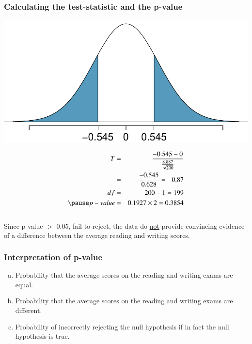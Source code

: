 \begin{frame}[shrink]
\frametitle{Calculating the test-statistic and the p-value}


{
\begin{center}
\includegraphics[width=\textwidth]{7-2_paired/figures/hsb2/hsb2_read_write_pval}
\end{center}
}
{
\pause
\begin{eqnarray*}
T &=& \frac{-0.545 - 0}{\frac{8.887}{\sqrt{200}}} \\
&=& \frac{-0.545}{0.628} = -0.87 \\
df &=& 200 - 1 = 199 \\
\pause
p-value &=& 0.1927 \times 2 = 0.3854
\end{eqnarray*}
}
\pause 
$\:$ \\
Since p-value $>$ 0.05, fail to reject, the data do \underline{not} provide convincing evidence of a difference between the average reading and writing scores.

\end{frame}


\begin{frame}
\frametitle{Interpretation of p-value}


\begin{enumerate}[(a)]
\item Probability that the average scores on the reading and writing exams are equal.
\item Probability that the average scores on the reading and writing exams are different.
\item Probability of incorrectly rejecting the null hypothesis if in fact the null hypothesis is true.
\end{enumerate}

\end{frame}

